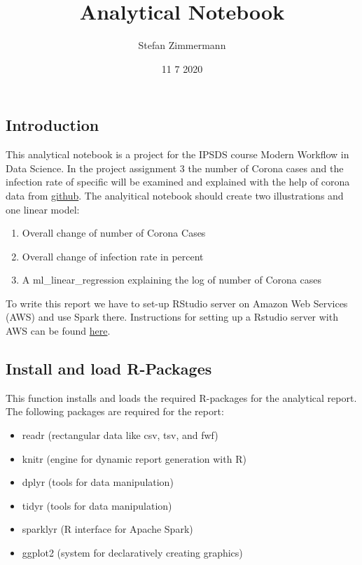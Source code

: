\documentclass[]{article}
\title{Analytical Notebook}
\author{Stefan Zimmermann}
\date{11 7 2020}
\providecommand{\tightlist}{%
  \setlength{\itemsep}{0pt}\setlength{\parskip}{0pt}}
\begin{document}
\maketitle

\hypertarget{introduction}{%
\subsection{Introduction}\label{introduction}}

This analytical notebook is a project for the IPSDS course Modern
Workflow in Data Science. In the project assignment 3 the number of
Corona cases and the infection rate of specific will be examined and
explained with the help of corona data from
\href{https://github.com/CSSEGISandData/COVID-19/tree/master/csse_covid_19_data}{github}.
The analyitical notebook should create two illustrations and one linear
model:

\begin{enumerate}
\def\labelenumi{\arabic{enumi}.}
\tightlist
\item
  Overall change of number of Corona Cases
\item
  Overall change of infection rate in percent
\item
  A ml\_linear\_regression explaining the log of number of Corona cases
\end{enumerate}

To write this report we have to set-up RStudio server on Amazon Web
Services (AWS) and use Spark there. Instructions for setting up a
Rstudio server with AWS can be found
\href{https://towardsdatascience.com/how-to-run-rstudio-on-aws-in-under-3-minutes-for-free-65f8d0b6ccda}{here}.

\hypertarget{install-and-load-r-packages}{%
\subsection{Install and load
R-Packages}\label{install-and-load-r-packages}}

This function installs and loads the required R-packages for the
analytical report. The following packages are required for the report:

\begin{itemize}
\tightlist
\item
  readr (rectangular data like csv, tsv, and fwf)
\item
  knitr (engine for dynamic report generation with R)
\item
  dplyr (tools for data manipulation)
\item
  tidyr (tools for data manipulation)
\item
  sparklyr (R interface for Apache Spark)
\item
  ggplot2 (system for declaratively creating graphics)
\end{itemize}
\end{document}
